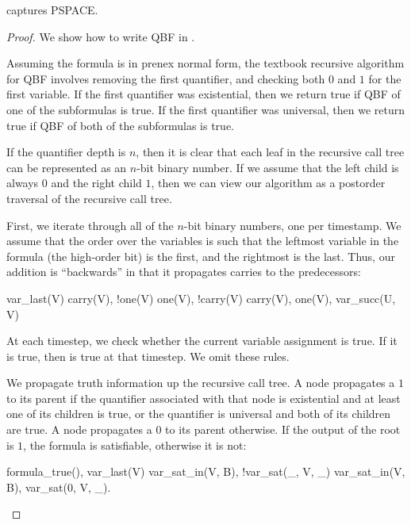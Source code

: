 \begin{lemma}
\label{lem:lang-pspace}
\lang captures PSPACE.
\end{lemma}
\begin{proof}
We show how to write QBF in \lang.

Assuming the formula is in prenex normal form, the textbook recursive algorithm for QBF  involves removing the first quantifier, and checking both $0$ and $1$ for the first variable.  If the first quantifier was existential, then we return true if QBF of one of the subformulas is true.  If the first quantifier was universal, then we return true if QBF of both of the subformulas is true.

If the quantifier depth is $n$, then it is clear that each leaf in the recursive call tree can be represented as an $n$-bit binary number.  If we assume that the left child is always $0$ and the right child $1$, then we can view our algorithm as a postorder traversal of the recursive call tree.

First, we iterate through all of the $n$-bit binary numbers, one per timestamp.  We assume that the order over the variables is such that the leftmost variable in the formula (the high-order bit) is the first, and the rightmost is the last.  Thus, our addition is ``backwards'' in that it propagates carries to the predecessors:

\begin{Drules}
        {var_last(V)}
        {carry(V), !one(V)}
        {one(V), !carry(V)}
        {carry(V), one(V), var_succ(U, V)}
\end{Drules}

At each timestep, we check whether the current variable assignment is true.  If it is true, then  is true at that timestep.  We omit these rules.

We propagate truth information up the recursive call tree.  A node propagates a $1$ to its parent if the quantifier associated with that node is existential and at least one of its children is true, or the quantifier is universal and both of its children are true.  A node propagates a $0$ to its parent otherwise.  If the output of the root is $1$, the formula is satisfiable, otherwise it is not: 

\begin{Drules}
        {formula_true(), var_last(V)}
        {var_sat_in(V, B), !var_sat(_, V, _)}
        {var_sat_in(V, B), var_sat(0, V, _).}
\end{Drules}


\end{proof}
